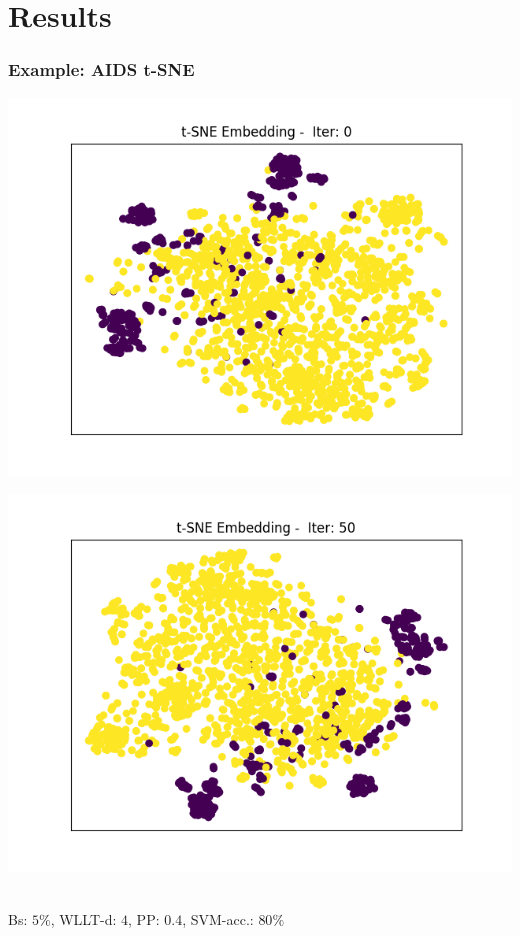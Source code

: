 \section{Results}

\begin{frame}\frametitle{Example: AIDS t-SNE}
	\begin{minipage}{0.49\textwidth}
		\includegraphics[width=\textwidth]{images/plot8tSNE}
	\end{minipage}
	\begin{minipage}{0.49\textwidth}
		\includegraphics[width=\textwidth]{images/plot9tSNE}
	\end{minipage}
\vspace{2cm} \\
\tiny{Bs: $5\%$, WLLT-d: $4$, PP: $0.4$, SVM-acc.: $80\%$}
\end{frame}

